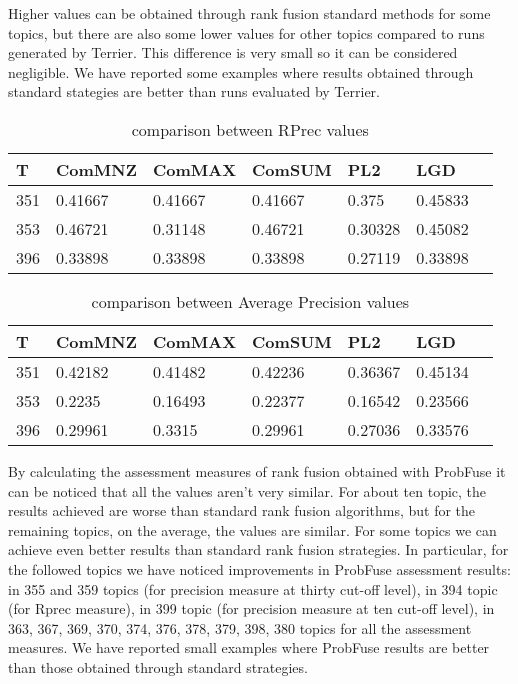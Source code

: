 \documentclass[12pt,journal]{IEEEtran}
\begin{document}
Higher values can be obtained through rank fusion standard methods for some topics, but there are also some lower values for other topics compared to runs generated by Terrier. This difference is very small so it can be considered negligible. We have reported some examples where results obtained through standard stategies are better than runs evaluated by Terrier. \\
\begin{table}[h!]
\centering
\caption{comparison between RPrec values}
\begin{tabular}{|l|l|l|l|l|l|l|}
\hline
T   & ComMNZ  & ComMAX  & ComSUM  & PL2  & LGD \\ \hline
351 & 0.41667 & 0.41667 & 0.41667 & 0.375   & 0.45833 \\ \hline
353 & 0.46721 & 0.31148 & 0.46721 & 0.30328 & 0.45082 \\ \hline
396 & 0.33898 & 0.33898 & 0.33898 & 0.27119 & 0.33898 \\ \hline 
\end{tabular}
\end{table}

\begin{table}[h!]
\centering
\caption{comparison between Average Precision values}
\begin{tabular}{|l|l|l|l|l|l|l|}
\hline
T   & ComMNZ  & ComMAX  & ComSUM  & PL2  & LGD  \\ \hline
351 & 0.42182 & 0.41482 & 0.42236 & 0.36367 & 0.45134 \\ \hline
353 & 0.2235  & 0.16493 & 0.22377 & 0.16542 & 0.23566 \\ \hline
396 & 0.29961 & 0.3315  & 0.29961 & 0.27036 & 0.33576 \\ \hline
\end{tabular}
\end{table} 

By calculating the assessment measures of rank fusion obtained with ProbFuse it can be noticed that all the values aren’t very similar. For about ten topic, the results achieved are worse than standard rank fusion algorithms, but for the remaining topics, on the average, the values are similar. For some topics we can achieve even better results than standard rank fusion strategies.
In particular, for the followed topics we have noticed improvements in ProbFuse assessment results: in 355 and 359 topics (for precision measure at thirty cut-off level), in 394 topic (for Rprec measure), in 399 topic (for precision measure at ten cut-off level), in 363, 367, 369, 370, 374, 376, 378, 379, 398, 380 topics for all the assessment measures. We have reported small examples where ProbFuse results are better than those obtained through standard strategies. \\ \\ \\ \\
\end{document}
